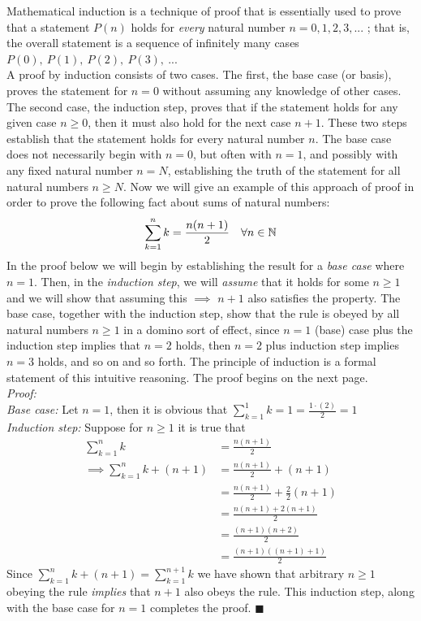 Mathematical induction is a technique of proof that is essentially used to prove that a statement $P(n)$ holds for \textit{every} natural number $n = 0, 1, 2, 3, ...$ ; that is, the overall statement is a sequence of infinitely many cases $P(0), \ P(1), \ P(2), \ P(3), \ ...$ \\
\noindent A proof by induction consists of two cases. The first, the base case (or basis), proves the statement for $n = 0$ without assuming any knowledge of other cases. The second case, the induction step, proves that if the statement holds for any given case $n\geq 0$, then it must also hold for the next case $n + 1$. These two steps establish that the statement holds for every natural number $n$. The base case does not necessarily begin with $n = 0$, but often with $n = 1$, and possibly with any fixed natural number $n = N$, establishing the truth of the statement for all natural numbers $n \geq N$. Now we will give an example of this approach of proof in order to prove the following fact about sums of natural numbers:
\begin{align}
    \sum_{k=1}^{n} k = \frac{n(n+1)}{2} \ \ \ \forall n \in {\mathbb{N}} \nonumber
\end{align}
In the proof below we will begin by establishing the result for a \textit{base case} where $n=1$. Then, in the \textit{induction step}, we will \textit{assume} that it holds for some $n\geq 1$ and we will show that assuming this $\implies$ $n+1$ also satisfies the property. The base case, together with the induction step, show that the rule is obeyed by all natural numbers $n\geq 1$ in a domino sort of effect, since $n=1$ (base) case plus the induction step implies that $n=2$ holds, then $n=2$ plus induction step implies $n=3$ holds, and so on and so forth. The principle of induction is a formal statement of this intuitive reasoning. The proof begins on the next page.\\

\noindent \textit{Proof:}\\
\noindent\textit{Base case:} Let $n=1$, then it is obvious that $\sum_{k=1}^1 k = 1 = \frac{1\cdot(2)}{2}=1$\\
\textit{Induction step:} Suppose for $n\geq 1$ it is true that 
\begin{align}
    \sum_{k=1}^n k&=\frac{n(n+1)}{2}\nonumber\\ 
    \implies \sum_{k=1}^{n} k + (n+1)&=\frac{n(n+1)}{2} +(n+1)\nonumber\\ 
    &=\frac{n(n+1)}{2} +\frac{2}{2}(n+1)\nonumber\\
    &=\frac{n(n+1)+2(n+1)}{2} \nonumber \\
    &=\frac{(n+1)(n+2)}{2} \nonumber \\
    &=\frac{(n+1)((n+1)+1)}{2} \nonumber
\end{align}
Since $\sum_{k=1}^{n} k + (n+1)=\sum_{k=1}^{n+1} k$ we have shown that arbitrary $n\geq 1$ obeying the rule \textit{implies} that $n+1$ also obeys the rule. This induction step, along with the base case for $n=1$ completes the proof. $\blacksquare$
\newpage

